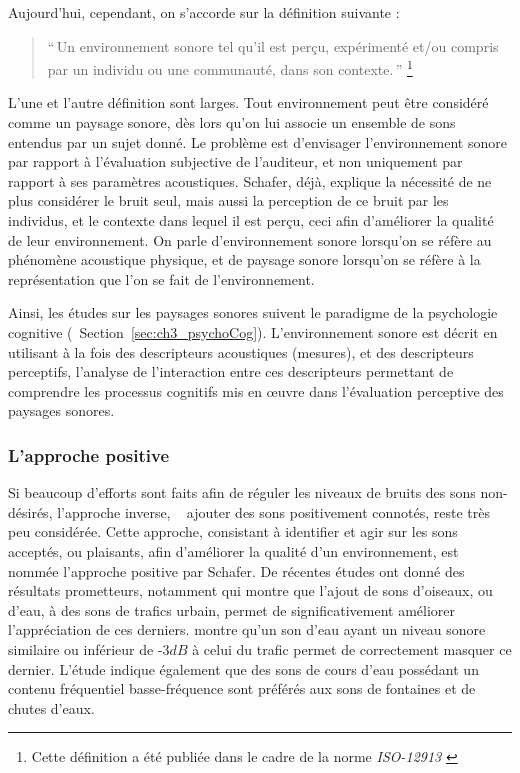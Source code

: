 Aujourd'hui, cependant, on s'accorde sur la définition suivante \citep{aletta2016soundscape}:

\begin{quote}
``\,Un environnement sonore tel qu'il est perçu, expérimenté et/ou compris par un individu ou une communauté, dans son contexte.\,'' \footnote{Cette définition a été publiée dans le cadre de la norme \emph{ISO-12913} \citep{iso12913}}
\end{quote}

L'une et l'autre définition sont larges. Tout environnement peut être considéré comme un paysage sonore, dès lors qu'on lui associe un ensemble de sons entendus par un sujet donné. Le problème est d'envisager l’environnement sonore par rapport à l'évaluation subjective de l'auditeur, et non uniquement par rapport à ses paramètres acoustiques. Schafer, déjà, explique la nécessité de ne plus considérer le bruit seul, mais aussi la perception de ce bruit par les individus, et le contexte dans lequel il est perçu, ceci afin d'améliorer la qualité de leur environnement. On parle d'environnement sonore lorsqu'on se réfère au phénomène acoustique physique, et de paysage sonore lorsqu'on se réfère à la représentation que l'on se fait de l'environnement.

Ainsi, les études sur les paysages sonores suivent le paradigme de la psychologie cognitive \citep{dubois2006cognitive,maffiolo_caracterisation_1999} (\cf~Section~\ref{sec:ch3_psychoCog}). L'environnement sonore est décrit en utilisant à la fois des descripteurs acoustiques (mesures), et des descripteurs perceptifs, l'analyse de l'interaction entre ces descripteurs permettant de comprendre les processus cognitifs mis en œuvre dans l'évaluation perceptive des paysages sonores.

\subsubsection{L'approche positive}

Si beaucoup d’efforts sont faits afin de réguler les niveaux de bruits des sons non-désirés, l'approche inverse, \ie~ ajouter des sons positivement connotés, reste très peu considérée. Cette approche, consistant à identifier et agir sur les sons acceptés, ou plaisants, afin d'améliorer la qualité d'un environnement, est nommée l'approche positive par Schafer. De récentes études ont donné des résultats prometteurs, notamment \citep{hong2013designing} qui montre que l'ajout de sons d'oiseaux, ou d'eau, à des sons de trafics urbain, permet de significativement améliorer l'appréciation de ces derniers. \citep{galbrun2012perceptual} montre qu'un son d'eau ayant un niveau sonore similaire ou inférieur de -3$dB$ à celui du trafic permet de correctement masquer ce dernier. L'étude indique également que des sons de cours d'eau possédant un contenu fréquentiel basse-fréquence sont préférés aux sons de fontaines et de chutes d'eaux.

